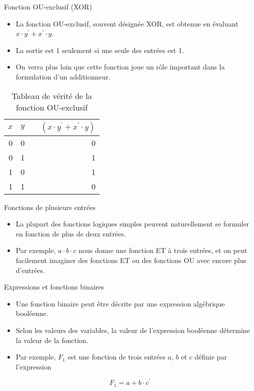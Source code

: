 \documentclass[presentation]{beamer}
\begin{document}
\begin{frame}[label={sec:orgc6be7ad}]{Fonction OU-exclusif (XOR)}
\begin{itemize}
\item La fonction OU-exclusif, souvent désignée XOR, est obtenue en évaluant \(x \cdot y^\prime + x^\prime \cdot y\).

\item La sortie est 1 seulement si une seule des entrées est 1.

\item On verra plus loin que cette fonction joue un rôle important dans la formulation d'un additionneur.
\end{itemize}

\begin{table}[htbp]
\caption{\label{tab:org877423d}Tableau de vérité de la fonction OU-exclusif}
\centering
\begin{tabular}{rrlr}
\(x\) & \(y\) &  & \((x \cdot y^\prime + x^\prime \cdot y)\)\\[0pt]
\hline
0 & 0 &  & 0\\[0pt]
0 & 1 &  & 1\\[0pt]
1 & 0 &  & 1\\[0pt]
1 & 1 &  & 0\\[0pt]
\end{tabular}
\end{table}
\end{frame}

\begin{frame}[label={sec:org8a2722f}]{Fonctions de plusieurs entrées}
\begin{itemize}
\item La plupart des fonctions logiques simples peuvent naturellement se formuler en fonction de plus de deux entrées.

\item Par exemple, \(a \cdot b \cdot c\) nous donne une fonction ET à trois entrées, et on peut facilement imaginer des fonctions ET ou des fonctions OU avec encore plus d'entrées.
\end{itemize}
\end{frame}

\begin{frame}[label={sec:orgca9c905}]{Expressions et fonctions binaires}
\begin{itemize}
\item Une fonction binaire peut être décrite par une expression algébrique booléenne.

\item Selon les valeurs des variables, la valeur de l'expression booléenne détermine la valeur de la fonction.

\item Par exemple, \(F_1\) est une fonction de trois entrées \(a\), \(b\) et \(c\) définie par l'expression
\end{itemize}

$$ F_1 = a + b \cdot c^\prime $$
\end{frame}
\end{document}
